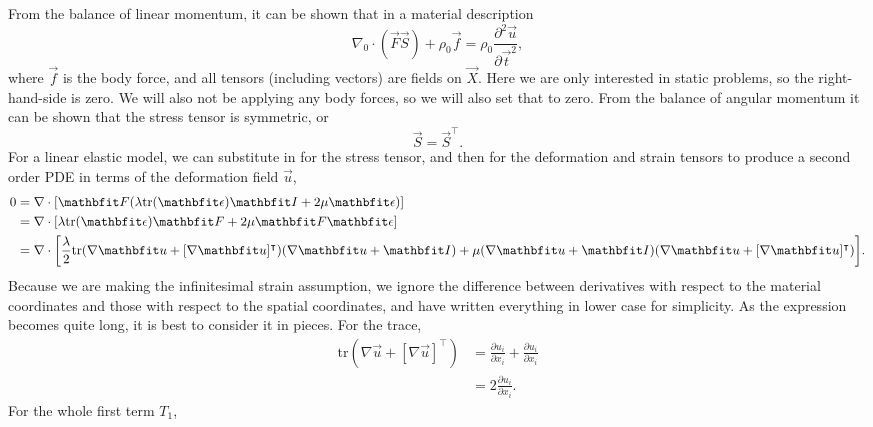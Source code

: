 From the balance of linear momentum, it can be shown that in a material description
\begin{equation}
    \nabla_{0} \cdot (\vec{F} \vec{S}) + \rho_{0} \vec{f} = \rho_{0} \frac{\partial^{2} \vec{u}}{\partial \vec{t}^{2}},
\end{equation}
where $\vec{f}$ is the body force, and all tensors (including vectors) are fields on $\vec{X}$.
Here we are only interested in static problems, so the right-hand-side is zero.
We will also not be applying any body forces, so we will also set that to zero.
From the balance of angular momentum it can be shown that the stress tensor is symmetric, or
\begin{equation}
    \vec{S} = \vec{S}^{\intercal}.
\end{equation}
For a linear elastic model, we can substitute in for the stress tensor, and then for the deformation and strain tensors to produce a second order PDE in terms of the deformation field $\vec{u}$,
\begin{align}
        0 &= \nabla \cdot [\vec{F} (\lambda \textrm{tr} (\vec{\epsilon}) \vec{I} + 2 \mu \vec{\epsilon}) ] \nonumber\\
          &= \nabla \cdot [\lambda \textrm{tr} (\vec{\epsilon}) \vec{F} + 2 \mu \vec{F} \vec{\epsilon}] \nonumber\\
          &= \nabla \cdot \mleft[ \frac{\lambda}{2} \textrm{tr} ( \nabla \vec{u} + [\nabla \vec{u}]^{\intercal})(\nabla \vec{u} + \vec{I}) + \mu (\nabla \vec{u} + \vec{I})(\nabla \vec{u} + [\nabla \vec{u}]^{\intercal}) \mright].
\end{align}
Because we are making the infinitesimal strain assumption, we ignore the difference between derivatives with respect to the material coordinates and those with respect to the spatial coordinates, and have written everything in lower case for simplicity.
As the expression becomes quite long, it is best to consider it in pieces.
For the trace,
\begin{align}
    \textrm{tr} (\nabla \vec{u} + [\nabla \vec{u}]^{\intercal}) &= \frac{\partial u_{i}}{\partial x_{i}} + \frac{\partial u_{i}}{\partial x_{i}} \nonumber\\
                                                                    &= 2 \frac{\partial u_{i}}{\partial x_{i}}.
\end{align}
For the whole first term $T_1$,
